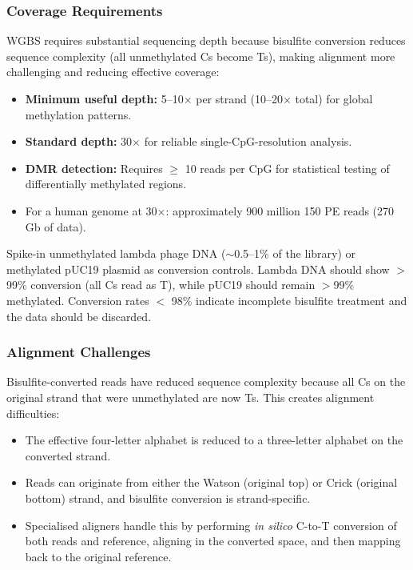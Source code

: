 \subsubsection{Coverage Requirements}

WGBS requires substantial sequencing depth because bisulfite conversion reduces sequence complexity (all unmethylated Cs become Ts), making alignment more challenging and reducing effective coverage:

\begin{itemize}[itemsep=2pt]
  \item \textbf{Minimum useful depth:} 5--10$\times$ per strand (10--20$\times$ total) for global methylation patterns.
  \item \textbf{Standard depth:} 30$\times$ for reliable single-CpG-resolution analysis.
  \item \textbf{DMR detection:} Requires $\geq$ 10 reads per CpG for statistical testing of differentially methylated regions.
  \item For a human genome at 30$\times$: approximately 900 million 150\basepair{} PE reads (270\,Gb of data).
\end{itemize}

\begin{tipbox}
Spike-in unmethylated lambda phage DNA ($\sim$0.5--1\% of the library) or methylated pUC19 plasmid as conversion controls. Lambda DNA should show $>$99\% conversion (all Cs read as T), while pUC19 should remain $>$99\% methylated. Conversion rates $<$ 98\% indicate incomplete bisulfite treatment and the data should be discarded.
\end{tipbox}

\subsubsection{Alignment Challenges}

Bisulfite-converted reads have reduced sequence complexity because all Cs on the original strand that were unmethylated are now Ts. This creates alignment difficulties:

\begin{itemize}[itemsep=2pt]
  \item The effective four-letter alphabet is reduced to a three-letter alphabet on the converted strand.
  \item Reads can originate from either the Watson (original top) or Crick (original bottom) strand, and bisulfite conversion is strand-specific.
  \item Specialised aligners handle this by performing \textit{in silico} C-to-T conversion of both reads and reference, aligning in the converted space, and then mapping back to the original reference.
\end{itemize}

